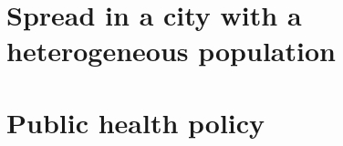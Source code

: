 \documentclass{article}
\begin{document}
\section{Spread in a city with a heterogeneous population}

\section{Public health policy}
\end{document}

